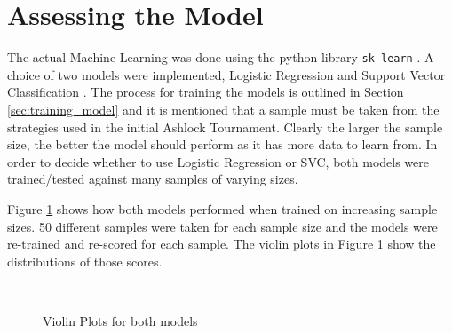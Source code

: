 \section{Assessing the Model}\label{sec:assessing_model}

The actual Machine Learning was done using the python library \texttt{sk-learn} \cite{scikit-learn}.
A choice of two models were implemented, Logistic Regression \cite{Schmidt2016, Yu2011} and Support Vector Classification \cite{Smola2004, Vandewalle1999}.
The process for training the models is outlined in Section \ref{sec:training_model} and it is mentioned that a sample must be taken from the strategies used in the initial Ashlock Tournament.
Clearly the larger the sample size, the better the model should perform as it has more data to learn from.
In order to decide whether to use Logistic Regression or SVC, both models were trained/tested against many samples of varying sizes.

Figure \ref{fig:score_4_sample_size} shows how both models performed when trained on increasing sample sizes.
50 different samples were taken for each sample size and the models were re-trained and re-scored for each sample.
The violin plots in Figure \ref{fig:score_4_sample_size} show the distributions of those scores.

\begin{figure}[htbp!]
    \centering
    \\
    \caption{Violin Plots for both models}
    \label{fig:score_4_sample_size}
\end{figure}

